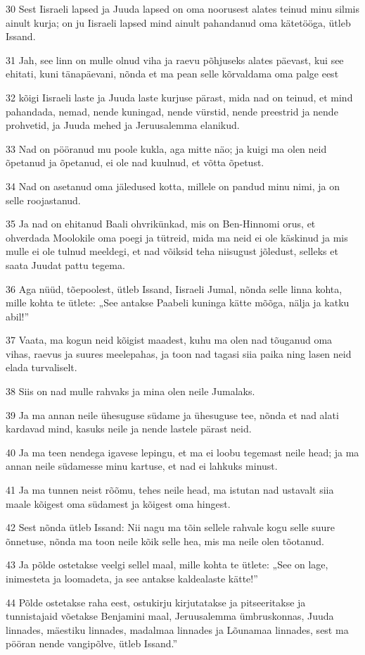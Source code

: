 \par 30 Sest Iisraeli lapsed ja Juuda lapsed on oma noorusest alates teinud minu silmis ainult kurja; on ju Iisraeli lapsed mind ainult pahandanud oma kätetööga, ütleb Issand.
\par 31 Jah, see linn on mulle olnud viha ja raevu põhjuseks alates päevast, kui see ehitati, kuni tänapäevani, nõnda et ma pean selle kõrvaldama oma palge eest
\par 32 kõigi Iisraeli laste ja Juuda laste kurjuse pärast, mida nad on teinud, et mind pahandada, nemad, nende kuningad, nende vürstid, nende preestrid ja nende prohvetid, ja Juuda mehed ja Jeruusalemma elanikud.
\par 33 Nad on pööranud mu poole kukla, aga mitte näo; ja kuigi ma olen neid õpetanud ja õpetanud, ei ole nad kuulnud, et võtta õpetust.
\par 34 Nad on asetanud oma jäledused kotta, millele on pandud minu nimi, ja on selle roojastanud.
\par 35 Ja nad on ehitanud Baali ohvrikünkad, mis on Ben-Hinnomi orus, et ohverdada Moolokile oma poegi ja tütreid, mida ma neid ei ole käskinud ja mis mulle ei ole tulnud meeldegi, et nad võiksid teha niisugust jõledust, selleks et saata Juudat pattu tegema.
\par 36 Aga nüüd, tõepoolest, ütleb Issand, Iisraeli Jumal, nõnda selle linna kohta, mille kohta te ütlete: „See antakse Paabeli kuninga kätte mõõga, nälja ja katku abil!”
\par 37 Vaata, ma kogun neid kõigist maadest, kuhu ma olen nad tõuganud oma vihas, raevus ja suures meelepahas, ja toon nad tagasi siia paika ning lasen neid elada turvaliselt.
\par 38 Siis on nad mulle rahvaks ja mina olen neile Jumalaks.
\par 39 Ja ma annan neile ühesuguse südame ja ühesuguse tee, nõnda et nad alati kardavad mind, kasuks neile ja nende lastele pärast neid.
\par 40 Ja ma teen nendega igavese lepingu, et ma ei loobu tegemast neile head; ja ma annan neile südamesse minu kartuse, et nad ei lahkuks minust.
\par 41 Ja ma tunnen neist rõõmu, tehes neile head, ma istutan nad ustavalt siia maale kõigest oma südamest ja kõigest oma hingest.
\par 42 Sest nõnda ütleb Issand: Nii nagu ma tõin sellele rahvale kogu selle suure õnnetuse, nõnda ma toon neile kõik selle hea, mis ma neile olen tõotanud.
\par 43 Ja põlde ostetakse veelgi sellel maal, mille kohta te ütlete: „See on lage, inimesteta ja loomadeta, ja see antakse kaldealaste kätte!”
\par 44 Põlde ostetakse raha eest, ostukirju kirjutatakse ja pitseeritakse ja tunnistajaid võetakse Benjamini maal, Jeruusalemma ümbruskonnas, Juuda linnades, mäestiku linnades, madalmaa linnades ja Lõunamaa linnades, sest ma pööran nende vangipõlve, ütleb Issand.”

